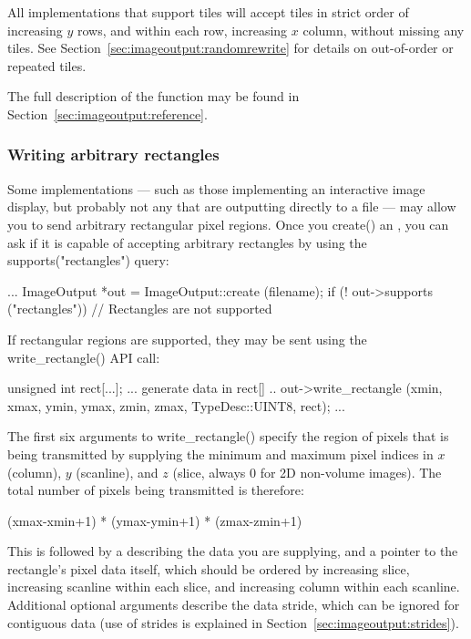 All \ImageOutput implementations that support tiles will accept tiles in
strict order of increasing $y$ rows, and within each row, increasing $x$
column, without missing any tiles.  See
Section~\ref{sec:imageoutput:randomrewrite} for details on out-of-order
or repeated tiles.

The full description of the \writetile function may be found
in Section~\ref{sec:imageoutput:reference}.

\subsubsection{Writing arbitrary rectangles}

Some \ImageOutput implementations --- such as those implementing an
interactive image display, but probably not any that are outputting
directly to a file --- may allow you to send arbitrary rectangular pixel
regions.  Once you {\kw create()} an \ImageOutput, you can ask if it is
capable of accepting arbitrary rectangles by using the {\kw
supports("rectangles")} query:

\begin{code}
        ...
        ImageOutput *out = ImageOutput::create (filename);
        if (! out->supports ("rectangles")) {
            // Rectangles are not supported
        }
\end{code}

If rectangular regions are supported, they may be sent using
the {\kw write_rectangle()} API call:

\begin{code}
        unsigned int rect[...];
        ... generate data in rect[] ..
        out->write_rectangle (xmin, xmax, ymin, ymax, zmin, zmax, TypeDesc::UINT8, rect);
        ...
\end{code}

The first six arguments to {\kw write_rectangle()} specify the region of
pixels that is being transmitted by supplying the minimum and maximum
pixel indices in $x$ (column), $y$ (scanline), and $z$ (slice, always 0
for 2D non-volume images).  The total number of pixels being transmitted
is therefore:
\begin{code}
        (xmax-xmin+1) * (ymax-ymin+1) * (zmax-zmin+1)
\end{code}
\noindent This is followed by a \TypeDesc describing the data you
are supplying, and a pointer to the rectangle's pixel data itself, which
should be ordered by increasing slice, increasing scanline within each
slice, and increasing column within each scanline.  Additional optional
arguments describe the data stride, which can be ignored for contiguous
data (use of strides is explained in
Section~\ref{sec:imageoutput:strides}).


